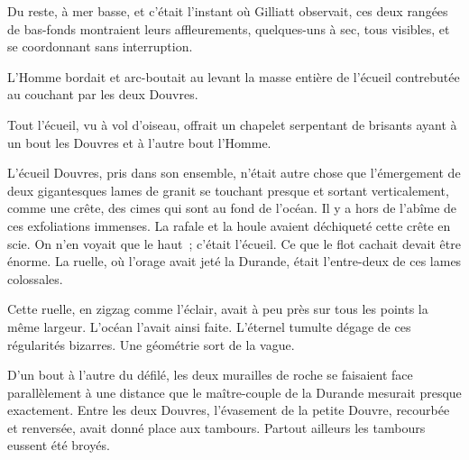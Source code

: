 \documentclass[french,twoside]{book} %
\begin{document}
Du reste, à mer basse, et c’était l’instant où  Gilliatt observait, ces deux rangées de bas-fonds montraient leurs affleurements, quelques-uns à sec, tous visibles, et se coordonnant sans interruption.\par
L’Homme bordait et arc-boutait au levant la masse entière de l’écueil contrebutée au couchant par les deux Douvres.\par
Tout l’écueil, vu à vol d’oiseau, offrait un chapelet serpentant de brisants ayant à un bout les Douvres et à l’autre bout l’Homme.\par
L’écueil Douvres, pris dans son ensemble, n’était autre chose que l’émergement de deux gigantesques lames de granit se touchant presque et sortant verticalement, comme une crête, des cimes qui sont au fond de l’océan. Il y a hors de l’abîme de ces exfoliations immenses. La rafale et la houle avaient déchiqueté cette crête en scie. On n’en voyait que le haut ; c’était l’écueil. Ce que le flot cachait devait être énorme. La ruelle, où l’orage avait jeté la Durande, était l’entre-deux de ces lames colossales.\par
Cette ruelle, en zigzag comme l’éclair, avait à peu près sur tous les points la même largeur. L’océan l’avait ainsi faite. L’éternel tumulte dégage de ces régularités bizarres. Une géométrie sort de la vague.\par
D’un bout à l’autre du défilé, les deux murailles de roche se faisaient face parallèlement à une distance que le maître-couple de la Durande mesurait presque exactement. Entre les deux Douvres, l’évasement de la petite Douvre, recourbée et renversée, avait donné place aux tambours. Partout ailleurs les tambours eussent été broyés.\par
\end{document}
